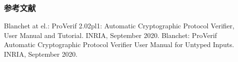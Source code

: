 \documentclass[dvipdfmx, dvipsnames, 11pt]{beamer}
\begin{document}
\begin{frame}[allowframebreaks]
  \frametitle{参考文献}

  \begin{thebibliography}{9}
     Blanchet at el.: ProVerif 2.02pl1: Automatic Cryptographic Protocol Verifier, User Manual and Tutorial. INRIA, September 2020.
     Blanchet: ProVerif Automatic Cryptographic Protocol Verifier User Manual for Untyped Inputs. INRIA, September 2020.
  \end{thebibliography}

\end{frame}




%
%
%
\end{document}
